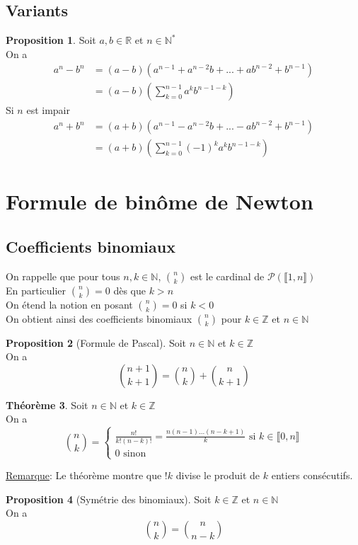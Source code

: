\documentclass[10pt,a4paper]{article}
\theoremstyle{definition}
\newtheorem{proposition}{Proposition}[section]
\newtheorem{theorem}[proposition]{Théorème}
\begin{document}
\subsection{Variants}
\begin{proposition}
Soit $a, b \in \mathbb{R}$ et $n \in \mathbb{N}^*$ \\
On a
\begin{align*}
a^n - b^n &= (a - b)(a^{n - 1} + a^{n - 2}b + ... + ab^{n - 2} + b^{n - 1})\\
&= (a - b)\left( \sum_{k = 0}^{n - 1} a^k b^{n - 1 -k} \right)
\end{align*}
Si $n$ est impair
\begin{align*}
a^n + b^n &= (a + b)(a^{n - 1} - a^{n - 2}b + ... - ab^{n - 2} + b^{n - 1})\\
&= (a + b)\left( \sum_{k = 0}^{n - 1} (-1)^k a^k b^{n - 1 -k} \right)
\end{align*}
\end{proposition}

\section{Formule de binôme de Newton}
\subsection{Coefficients binomiaux}
\noindent On rappelle que pour tous $n, k \in \mathbb{N}$, $\binom{n}{k}$ est le cardinal de $\mathcal{P}(\llbracket 1, n \rrbracket)$ \\
En particulier $\binom{n}{k} = 0$ dès que $k > n$ \\
On étend la notion en posant $\binom{n}{k} = 0$ si $k < 0$ \\
On obtient ainsi des coefficients binomiaux $\binom{n}{k}$ pour $k \in \mathbb{Z}$ et $n \in \mathbb{N}$
\begin{proposition}[Formule de Pascal]
Soit $n \in \mathbb{N}$ et $k \in \mathbb{Z}$ \\
On a
\[ \binom{n + 1}{k + 1} = \binom{n}{k} + \binom{n}{k + 1} \]
\end{proposition}
\begin{theorem}
Soit $n \in \mathbb{N}$ et $k \in \mathbb{Z}$ \\
On a
\[\binom{n}{k} = \begin{cases}
\frac{n!}{k!(n - k)!} = \frac{n(n - 1)...(n - k + 1)}{k} \text{ si } k \in \llbracket 0, n \rrbracket \\
0 \text{ sinon }
\end{cases} \]
\end{theorem}
\noindent \uline{Remarque}: Le théorème montre que $!k$ divise le produit de $k$ entiers consécutifs.
\begin{proposition}[Symétrie des binomiaux]
Soit $k \in \mathbb{Z}$ et $n \in \mathbb{N}$ \\
On a
\[ \binom{n}{k} = \binom{n}{n - k} \]
\end{proposition}
\end{document}
